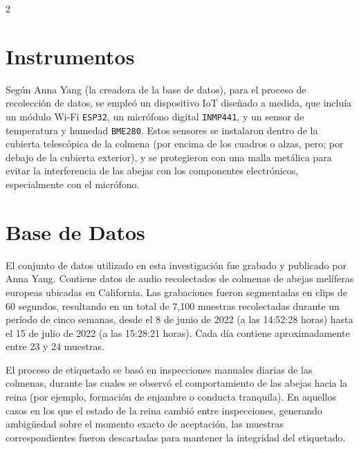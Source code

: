 \documentclass[12pt]{report}
\newenvironment{tightmulticols}{%
  \begin{multicols}{2}
  \setlength{\parskip}{1.2pt}
  \linespread{1}\selectfont
}{%
  \end{multicols}
}
\begin{document}
\begin{tightmulticols}

\section{Instrumentos}

\noindent Según Anna Yang (la creadora de la base de datos), para el proceso de recolección de datos, se empleó un dispositivo IoT diseñado a medida, que incluía un módulo Wi-Fi \texttt{ESP32}, un micrófono digital \texttt{INMP441}, y un sensor de temperatura y humedad \texttt{BME280}. Estos sensores se instalaron dentro de la cubierta telescópica de la colmena (por encima de los cuadros o alzas, pero; por debajo de la cubierta exterior), y se protegieron con una malla metálica para evitar la interferencia de las abejas con los componentes electrónicos, especialmente con el micrófono.

\section{Base de Datos}

\noindent El conjunto de datos utilizado en esta investigación fue grabado y publicado por Anna Yang\cite{AnnaYang-Dataset}. Contiene datos de audio recolectados de colmenas de abejas melíferas europeas ubicadas en California. Las grabaciones fueron segmentadas en clips de 60 segundos, resultando en un total de 7,100 muestras recolectadas durante un período de cinco semanas, desde el 8 de junio de 2022 (a las 14:52:28 horas) hasta el 15 de julio de 2022 (a las 15:28:21 horas). Cada día contiene aproximadamente entre 23 y 24 muestras.

\noindent El proceso de etiquetado se basó en inspecciones manuales diarias de las colmenas, durante las cuales se observó el comportamiento de las abejas hacia la reina (por ejemplo, formación de enjambre o conducta tranquila). En aquellos casos en los que el estado de la reina cambió entre inspecciones, generando ambigüedad sobre el momento exacto de aceptación, las muestras correspondientes fueron descartadas para mantener la integridad del etiquetado.

\end{tightmulticols}
\end{document}
